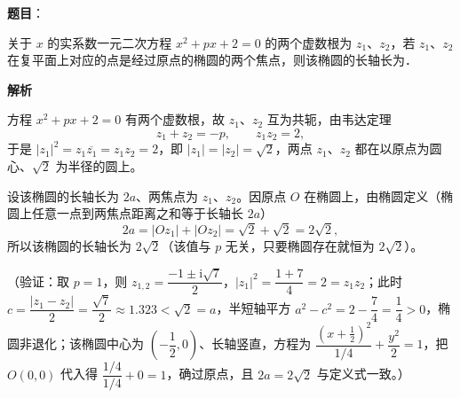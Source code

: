 \begin{answer}

\textbf{题目}：

关于 \(x\) 的实系数一元二次方程 \(x^{2}+px+2=0\) 的两个虚数根为 \(z_{1}\)、\(z_{2}\)，若 \(z_{1}\)、\(z_{2}\) 在复平面上对应的点是经过原点的椭圆的两个焦点，则该椭圆的长轴长为\gkblank{}．

\textbf{解析}

方程 \(x^{2}+px+2=0\) 有两个虚数根，故 \(z_{1}\)、\(z_{2}\) 互为共轭，由韦达定理
\nopagebreak[4]
\[
z_{1}+z_{2}=-p,\qquad z_{1}z_{2}=2,
\]
于是 \(|z_{1}|^{2}=z_{1}\overline{z_{1}}=z_{1}z_{2}=2\)，即 \(|z_{1}|=|z_{2}|=\sqrt{2}\)，两点 \(z_{1}\)、\(z_{2}\) 都在以原点为圆心、\(\sqrt{2}\) 为半径的圆上。

设该椭圆的长轴长为 \(2a\)、两焦点为 \(z_{1}\)、\(z_{2}\)。因原点 \(O\) 在椭圆上，由椭圆定义（椭圆上任意一点到两焦点距离之和等于长轴长 \(2a\)）
\nopagebreak[4]
\[
2a=|Oz_{1}|+|Oz_{2}|=\sqrt{2}+\sqrt{2}=2\sqrt{2},
\]
所以该椭圆的长轴长为 \(2\sqrt{2}\)（该值与 \(p\) 无关，只要椭圆存在就恒为 \(2\sqrt{2}\)）。

（验证：取 \(p=1\)，则 \(z_{1,2}=\dfrac{-1\pm\mathrm{i}\sqrt{7}}{2}\)，\(|z_{1}|^{2}=\dfrac{1+7}{4}=2=z_{1}z_{2}\)；此时 \(c=\dfrac{|z_{1}-z_{2}|}{2}=\dfrac{\sqrt{7}}{2}\approx1.323<\sqrt{2}=a\)，半短轴平方 \(a^{2}-c^{2}=2-\dfrac{7}{4}=\dfrac{1}{4}>0\)，椭圆非退化；该椭圆中心为 \(\left(-\dfrac{1}{2},0\right)\)、长轴竖直，方程为 \(\dfrac{\left(x+\frac{1}{2}\right)^{2}}{1/4}+\dfrac{y^{2}}{2}=1\)，把 \(O(0,0)\) 代入得 \(\dfrac{1/4}{1/4}+0=1\)，确过原点，且 \(2a=2\sqrt{2}\) 与定义式一致。）


\end{answer}
